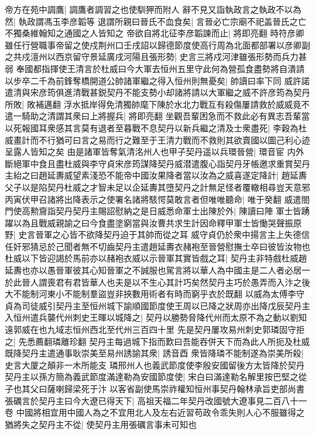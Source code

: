 帝方在苑中調鷹|{
	調鷹者調習之也使馴狎而附人}
辭不見又詣執政言之執政不以為然|{
	執政謂馮玉李彦韜等}
退謂所親曰晉氏不血食矣|{
	言晉必亡宗廟不祀盖晉氏之亡不獨桑維翰知之通國之人皆知之}
帝欲自將北征李彦韜諫而止|{
	將即亮翻}
時符彦卿雖任行營職事帝留之使戍荆州口壬戌詔以歸德節度使高行周為北面都部署以彦卿副之共戍澶州以西京留守景延廣戌河陽且張形勢|{
	史言三將戍河津雖張形勢而兵力甚弱}
奉國都指揮使王清言於杜威曰今大軍去恒州五里守此何為營孤食盡勢將自潰請以步卒二千為前鋒奪橋開道公帥諸軍繼之得入恒州則無憂矣|{
	帥讀曰率下同}
威許諾遣清與宋彦筠俱進清戰甚鋭契丹不能支勢小却諸將請以大軍繼之威不許彦筠為契丹所敗|{
	敗補邁翻}
浮水抵岸得免清獨帥麾下陳於水北力戰互有殺傷屢請救於威威竟不遣一騎助之清謂其衆曰上將握兵|{
	將即亮翻}
坐觀吾輩困急而不救此必有異志吾輩當以死報國耳衆感其言莫有退者至暮戰不息契丹以新兵繼之清及士衆盡死|{
	李穀為杜威畫計而不行猶可曰言之易而行之難至于王清力戰而不救則其欲賣國以圖己利心迹呈露人皆知之矣}
由是諸軍皆奪氣清洺州人也甲子契丹遥以兵環晉營|{
	環音宦}
内外斷絕軍中食且盡杜威與李守貞宋彦筠謀降契丹威潜遣腹心詣契丹牙帳邀求重賞契丹主紿之曰趙延夀威望素淺恐不能帝中國汝果降者當以汝為之威喜遂定降計|{
	趙延夀父子以是陷契丹杜威之才智未足以企延夀其墮契丹之計無足怪者覆轍相尋豈天意邪}
丙寅伏甲召諸將出降表示之使署名諸將駭愕莫敢言者但唯唯聽命|{
	唯于癸翻}
威遣閤門使高勲齎詣契丹契丹主賜詔慰納之是日威悉命軍士出陳於外|{
	陳讀曰陣}
軍士皆踴躍以為且戰威親諭之曰今食盡塗窮當與汝曹共求生計因命釋甲軍士皆慟哭聲振原野|{
	史言晉軍之心皆不欲降契丹迫于其帥而從之耳}
威守貞仍於衆中揚言主上失德信任奸邪猜忌於己聞者無不切齒契丹主遣趙延夀衣赭袍至晉營慰撫士卒曰彼皆汝物也杜威以下皆迎謁於馬前亦以赭袍衣威以示晉軍其實皆戲之耳|{
	契丹主非特戲杜威趙延夀也亦以愚晉軍彼其心知晉軍之不誠服也駕言將以華人為中國主是二人者必居一於此晉人謂喪君有君皆華人也夫是以不生心其計巧矣然契丹主巧於愚弄而入汴之後大不能制河東小不能制羣盜豈非挾數用術者有時而窮乎衣於既翻}
以威為太傅李守貞為司徒威引契丹主至恒州城下諭順國節度使王周以已降之狀周亦出降戊辰契丹主入恒州遣兵襲代州刺史王暉以城降之|{
	契丹以勝勢脅降代州而太原不為之動以劉知遠郭威在也九域志恒州西北至代州三百四十里}
先是契丹屢攻易州刺史郭璘固守拒之|{
	先悉薦翻璘離珍翻}
契丹主每過城下指而歎曰吾能吞併天下而為此人所扼及杜威既降契丹主遣通事耿崇美至易州誘諭其衆|{
	誘音酉}
衆皆降璘不能制遂為崇美所殺|{
	史言大厦之顛非一木所能支}
璘邢州人也義武節度使李殷安國留後方太皆降於契丹契丹主以孫方簡為義武節度滿達勒為安國節度使|{
	宋白曰滿達勒名解里按巴堅之從子也其父曰薩喇歸梁死于汴}
以客省副使馬崇祚權知恒州事契丹翰林承旨吏部尚書張礪言於契丹主曰今大遼已得天下|{
	高祖天福二年契丹改國號大遼事見二百八十一卷}
中國將相宜用中國人為之不宜用北人及左右近習苟政令乖失則人心不服雖得之猶將失之契丹主不從|{
	使契丹主用張礪言事未可知也}
